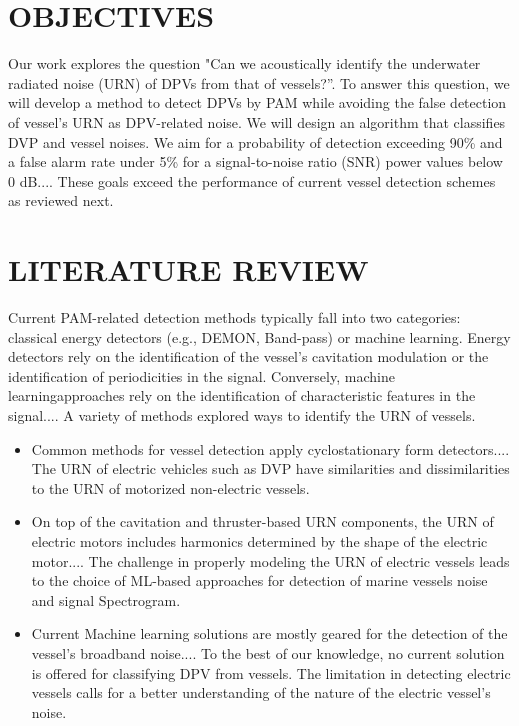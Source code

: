 \documentclass[12pt,a4paper]{article}
\begin{document}
\section{OBJECTIVES}
Our work explores the question "Can we acoustically identify the underwater radiated noise (URN) of DPVs
from that of vessels?”. To answer this question, we will develop a method to detect DPVs by PAM while
avoiding the false detection of vessel's URN as DPV-related noise. We will design an algorithm that
classifies DVP and vessel noises. We aim for a probability of detection exceeding 90\% and a false alarm
rate under 5\% for a signal-to-noise ratio (SNR) power values below 0 dB.... These goals exceed the
performance of current vessel detection schemes as reviewed next.

\section{LITERATURE REVIEW}
Current PAM-related detection methods typically fall into two categories: classical energy detectors (e.g.,
DEMON, Band-pass) or machine learning. Energy detectors rely on the identification of the vessel's
cavitation modulation or the identification of periodicities in the signal. Conversely, machine learningapproaches rely on the identification of characteristic features in the signal.... A variety of methods explored ways to identify the URN of vessels.

\begin{itemize}
    \item Common methods for vessel detection apply cyclostationary form detectors.... The URN of electric
vehicles such as DVP have similarities and dissimilarities to the URN of motorized non-electric vessels.
    \item On top of the cavitation and thruster-based URN components, the URN of electric motors includes
harmonics determined by the shape of the electric motor.... The challenge in properly modeling the URN
of electric vessels leads to the choice of ML-based approaches for detection of marine vessels noise
and signal Spectrogram.
    \item Current Machine learning solutions are mostly geared for the detection of the vessel's broadband
noise.... To the best of our knowledge, no current solution is offered for classifying DPV from vessels.
The limitation in detecting electric vessels calls for a better understanding of the nature of the electric
vessel's noise.
\end{itemize}
\end{document}
